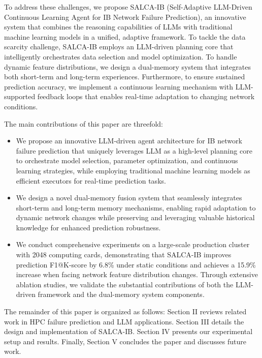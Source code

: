 \documentclass[conference]{IEEEtran}
\begin{document}
To address these challenges, we propose SALCA-IB (Self-Adaptive LLM-Driven Continuous Learning Agent for IB Network Failure Prediction), an innovative system that combines the reasoning capabilities of LLMs with traditional machine learning models in a unified, adaptive framework. To tackle the data scarcity challenge, SALCA-IB employs an LLM-driven planning core that intelligently orchestrates data selection and model optimization. To handle dynamic feature distributions, we design a dual-memory system that integrates both short-term and long-term experiences. Furthermore, to ensure sustained prediction accuracy, we implement a continuous learning mechanism with LLM-supported feedback loops that enables real-time adaptation to changing network conditions.

The main contributions of this paper are threefold:
\begin{itemize}
    \item We propose an innovative LLM-driven agent architecture for IB network failure prediction that uniquely leverages LLM as a high-level planning core to orchestrate model selection, parameter optimization, and continuous learning strategies, while employing traditional machine learning models as efficient executors for real-time prediction tasks.
    \item We design a novel dual-memory fusion system that seamlessly integrates short-term and long-term memory mechanisms, enabling rapid adaptation to dynamic network changes while preserving and leveraging valuable historical knowledge for enhanced prediction robustness.
    \item We conduct comprehensive experiments on a large-scale production cluster with 2048 computing cards, demonstrating that SALCA-IB improves prediction F1@K-score by 6.8\% under static conditions and achieves a 15.9\% increase when facing network feature distribution changes. Through extensive ablation studies, we validate the substantial contributions of both the LLM-driven framework and the dual-memory system components.
\end{itemize}

The remainder of this paper is organized as follows: Section II reviews related work in HPC failure prediction and LLM applications. Section III details the design and implementation of SALCA-IB. Section IV presents our experimental setup and results. Finally, Section V concludes the paper and discusses future work.
\end{document}
